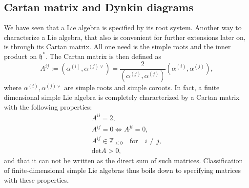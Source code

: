 \documentclass[11pt]{report}
\begin{document}
\subsection{Cartan matrix and Dynkin diagrams}
We have seen that a Lie algebra is specified by its root system. Another way to characterize a Lie algebra, that also is convenient for further extensions later on, is through its Cartan matrix. All one need is the simple roots and the inner product on $\mathfrak{h}^*$. The Cartan matrix is then defined as 
\begin{equation}
    A^{ij} := (\alpha^{(i)},\alpha^{(j)\vee})  = \frac{2}{(\alpha^{(j)},\alpha^{(j)})}(\alpha^{(i)},\alpha^{(j)}),
\end{equation}
where $\alpha^{(i)},\alpha^{(j)\vee}$ are simple roots and simple coroots. In fact, a finite dimensional simple Lie algebra is completely characterized by a Cartan matrix with the following properties:
\begin{equation}
    \begin{aligned}
        A^{ii} = 2,\\
        A^{ij} = 0 \Longleftrightarrow A^{ji} = 0,\\
        A^{ij}\in \mathbb{Z}_{\leq 0} \quad\text{for}\quad i\neq j,\\
        \text{det}A >0,
    \end{aligned}
\end{equation}
and that it can not be written as the direct sum of such matrices. Classification of finite-dimensional simple Lie algebras thus boils down to specifying matrices with these properties. 
\end{document}
